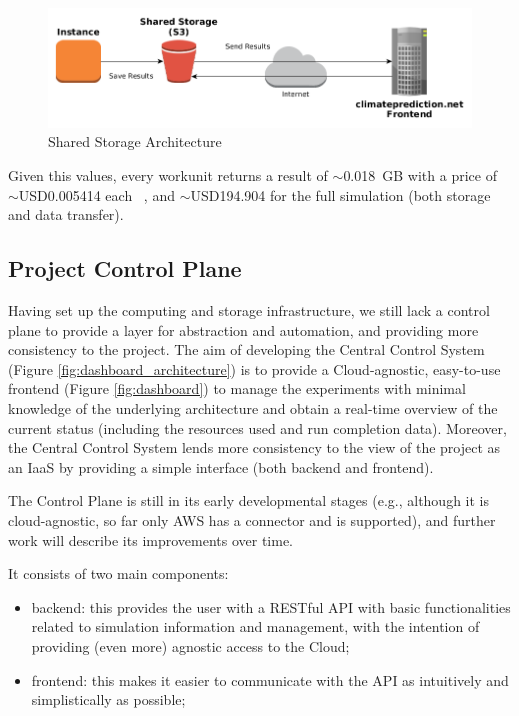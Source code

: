 \documentclass[journal abbreviation, manuscript]{copernicus}
\begin{document}
\begin{figure}[!h]
\centering
\includegraphics[width=4.5in]{images/storage_architecture}
\caption{Shared Storage Architecture}
\label{fig:storage}
\end{figure}

Given this values, every workunit returns a result of $\sim$0.018~GB with a price of $\sim$USD0.005414 each ~\citep{S3pricing}, and $\sim$USD194.904 for the full simulation (both storage and data transfer).

\subsection{Project Control Plane}

\label{section:control_plane}

Having set up the computing and storage infrastructure, we still lack a control plane to provide a layer for abstraction and automation, and providing more consistency to the project. The aim of developing the Central Control System (Figure \ref{fig:dashboard_architecture}) is to provide a Cloud-agnostic, easy-to-use frontend (Figure \ref{fig:dashboard}) to manage the experiments with minimal knowledge of the underlying architecture and obtain a real-time overview of the current status (including the resources used and run completion data). Moreover, the Central Control System lends more consistency to the view of the project as an IaaS by providing a simple interface (both backend and frontend).

The Control Plane is still in its early developmental stages (e.g., although it is cloud-agnostic, so far only AWS has a connector and is supported), and further work will describe its improvements over time.

It consists of two main components:

\begin{itemize}
 \item backend: this provides the user with a RESTful API with basic functionalities related to simulation information and management, with the intention of providing (even more) agnostic access to the Cloud;
 \item frontend: this makes it easier to communicate with the API as intuitively and simplistically as possible;
\end{itemize}
\end{document}
